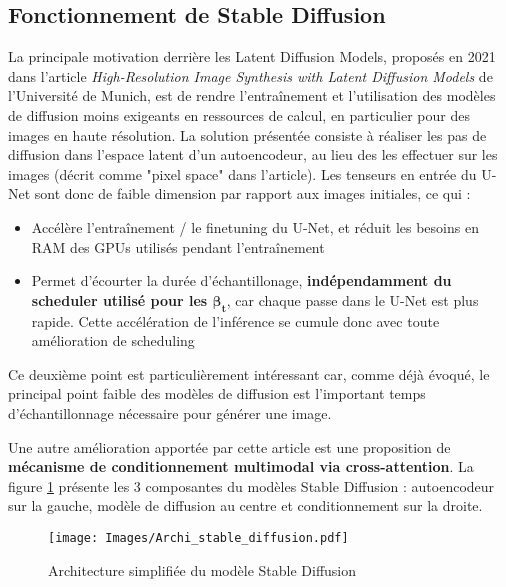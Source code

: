 \documentclass{article}
\begin{document}
\subsection{Fonctionnement de Stable Diffusion}

La principale motivation derrière les Latent Diffusion Models, proposés en 2021 dans l'article \textit{High-Resolution Image Synthesis with Latent Diffusion Models} \cite{rombach2021highresolution} de l'Université de Munich, est de rendre l'entraînement et l'utilisation des modèles de diffusion moins exigeants en ressources de calcul, en particulier pour des images en haute résolution. La solution présentée consiste à réaliser les pas de diffusion dans l'espace latent d'un autoencodeur, au lieu des les effectuer sur les images (décrit comme "pixel space" dans l'article). Les tenseurs en entrée du U-Net sont donc de faible dimension par rapport aux images initiales, ce qui :
\begin{itemize}
    \item Accélère l'entraînement / le finetuning du U-Net, et réduit les besoins en RAM des GPUs utilisés pendant l'entraînement
    \item Permet d'écourter la durée d'échantillonage, \textbf{indépendamment du scheduler utilisé pour les $\boldsymbol{\beta_t}$}, car chaque passe dans le U-Net est plus rapide. Cette accélération de l'inférence se cumule donc avec toute amélioration de scheduling
\end{itemize}
Ce deuxième point est particulièrement intéressant car, comme déjà évoqué, le principal point faible des modèles de diffusion est l'important temps d'échantillonnage nécessaire pour générer une image.

Une autre amélioration apportée par cette article est une proposition de \textbf{mécanisme de conditionnement multimodal via cross-attention}. La figure \ref{stable-diff} présente les 3 composantes du modèles Stable Diffusion : autoencodeur sur la gauche, modèle de diffusion au centre et conditionnement sur la droite.

\begin{figure}[H]
    \centering
    \texttt{[image: Images/Archi\_stable\_diffusion.pdf]}
    \caption{Architecture simplifiée du modèle Stable Diffusion}
    \label{stable-diff}
\end{figure}
\end{document}
